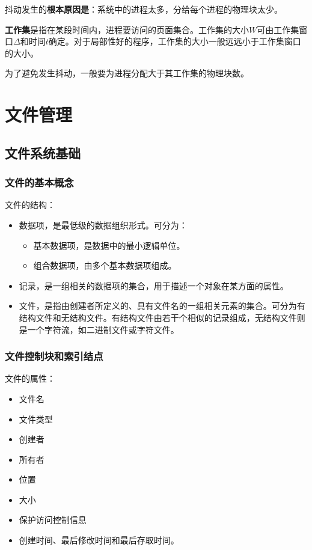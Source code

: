 \documentclass[12pt, a4paper, oneside]{ctexart}
\begin{document}
抖动发生的\textbf{根本原因是}：系统中的进程太多，分给每个进程的物理块太少。

\textbf{工作集}是指在某段时间内，进程要访问的页面集合。工作集的大小$W$可由工作集窗口$\Delta$和时间$t$确定。对于局部性好的程序，工作集的大小一般远远小于工作集窗口的大小。

为了避免发生抖动，一般要为进程分配大于其工作集的物理块数。

\section{文件管理}

\subsection{文件系统基础}

\subsubsection{文件的基本概念}

文件的结构：
\begin{itemize}
  \item 数据项，是最低级的数据组织形式。可分为：
  \begin{itemize}
    \item 基本数据项，是数据中的最小逻辑单位。
    \item 组合数据项，由多个基本数据项组成。
  \end{itemize}
  \item 记录，是一组相关的数据项的集合，用于描述一个对象在某方面的属性。
  \item 文件，是指由创建者所定义的、具有文件名的一组相关元素的集合。可分为有结构文件和无结构文件。有结构文件由若干个相似的记录组成，无结构文件则是一个字符流，如二进制文件或字符文件。
\end{itemize}

\subsubsection{文件控制块和索引结点}

文件的属性：
\begin{itemize}
  \item 文件名
  \item 文件类型
  \item 创建者
  \item 所有者
  \item 位置
  \item 大小
  \item 保护访问控制信息
  \item 创建时间、最后修改时间和最后存取时间。
\end{itemize}
\end{document}
